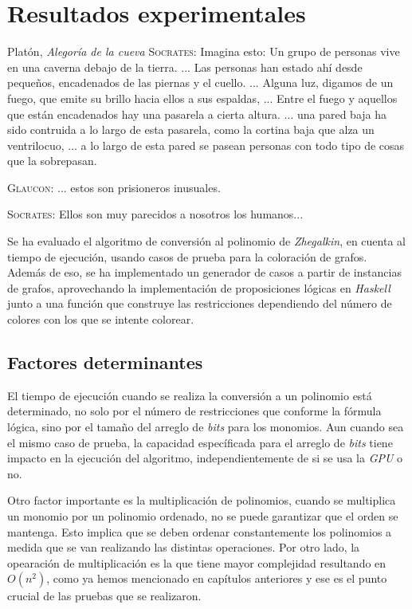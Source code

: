 \chapter{Resultados experimentales}

\begin{chapquote}{Platón, \textit{Alegoría de la cueva}}
\textsc{Socrates}: Imagina esto: Un grupo de personas vive en una caverna debajo de la tierra. ... Las personas han estado ahí desde pequeños, encadenados de las piernas y el cuello. ... Alguna luz, digamos de un fuego, que emite su brillo hacia ellos a sus espaldas, ... Entre el fuego y aquellos que están encadenados hay una pasarela a cierta altura. ... una pared baja ha sido contruida a lo largo de esta pasarela, como la cortina baja que alza un ventrilocuo, ... a lo largo de esta pared se pasean personas con todo tipo de cosas que la sobrepasan.

\hspace{2em}\textsc{Glaucon}: ... estos son prisioneros inusuales.

\hspace{2em}\textsc{Socrates}: Ellos son muy parecidos a nosotros los humanos...
\end{chapquote}

Se ha evaluado el algoritmo de conversión al polinomio de \textit{Zhegalkin}, en cuenta al tiempo de ejecución, usando casos de prueba para la coloración de grafos. Además de eso, se ha implementado un generador de casos a partir de instancias de grafos, aprovechando la implementación de proposiciones lógicas en \textit{Haskell} junto a una función que construye las restricciones dependiendo del número de colores con los que se intente colorear.

\section{Factores determinantes}

El tiempo de ejecución cuando se realiza la conversión a un polinomio está determinado, no solo por el número de restricciones que conforme la fórmula lógica, sino por el tamaño del arreglo de \textit{bits} para los monomios. Aun cuando sea el mismo caso de prueba, la capacidad específicada para el arreglo de \textit{bits} tiene impacto en la ejecución del algoritmo, independientemente de si se usa la \textit{GPU} o no.

Otro factor importante es la multiplicación de polinomios, cuando se multiplica un monomio por un polinomio ordenado, no se puede garantizar que el orden se mantenga. Esto implica que se deben ordenar constantemente los polinomios a medida que se van realizando las distintas operaciones. Por otro lado, la opearación de multiplicación es la que tiene mayor complejidad resultando en $O(n^2)$, como ya hemos mencionado en capítulos anteriores y ese es el punto crucial de las pruebas que se realizaron.


